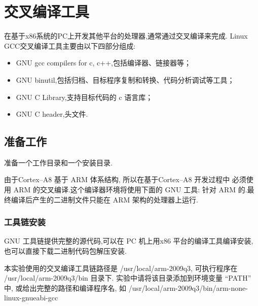 \chapter{交叉编译工具}

  在基于x86系统的PC上开发其他平台的处理器,通常通过交叉编译来完成.
Linux GCC交叉编译工具主要由以下四部分组成:

\begin{itemize}\itemsep=-3pt
  \item GNU gcc compilers for c, c++,包括编译器、链接器等；
  \item GNU binutil,包括归档、目标程序复制和转换、代码分析调试等工具；
  \item GNU C Library,支持目标代码的 c 语言库；
  \item GNU C header,头文件.
\end{itemize}

\section{准备工作}
  准备一个工作目录和一个安装目录.

	由于Cortex--A8 基于 ARM 体系结构, 所以在基于Cortex--A8 开发过程中
必须使用 ARM 的交叉编译.这个编译器环境将使用下面的 GNU 工具:
针对 ARM 的.最终编译后产生的二进制文件只能在 ARM 架构的处理器上运行.

\subsection{工具链安装}
	GNU 工具链提供完整的源代码,可以在 PC 机上用x86 平台的编译工具编译安装,
也可以直接下载二进制代码包解压安装.

	本实验使用的交叉编译工具链路径是 /usr/local/arm-2009q3, 可执行程序在
 /usr/local/arm-2009q3/bin 目录下. 实验中请将该目录添加到环境变量 ``PATH''
中, 或给出完整的路径和编译程序名, 如
/usr/local/arm-2009q3/bin/arm-none-linux-gnueabi-gcc
